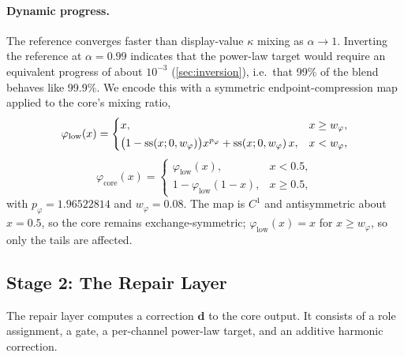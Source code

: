 \paragraph{Dynamic progress.}
The reference converges faster than display-value $\kappa$ mixing as $\alpha\to1$. Inverting the reference at $\alpha=0.99$ indicates that the power-law target would require an equivalent progress of about $10^{-3}$ (\cref{sec:inversion}), i.e.\ that 99\% of the blend behaves like 99.9\%. We encode this with a symmetric endpoint-compression map applied to the core's mixing ratio,
\begin{equation}
\varphi_{\mathrm{low}}(x)=
\begin{cases}
x, & x\ge w_{\varphi},\\[2pt]
\bigl(1-\operatorname{ss}(x;0,w_{\varphi})\bigr)x^{p_{\varphi}}+\operatorname{ss}(x;0,w_{\varphi})\,x, & x<w_{\varphi},
\end{cases}
\label{eq:philow}
\end{equation}
\begin{equation}
\varphi_{\mathrm{core}}(x)=
\begin{cases}
\varphi_{\mathrm{low}}(x), & x<0.5,\\
1-\varphi_{\mathrm{low}}(1-x), & x\ge0.5,
\end{cases}
\label{eq:phicore}
\end{equation}
with $p_{\varphi}=1.96522814$ and $w_{\varphi}=0.08$. The map is $C^{1}$ and antisymmetric about $x=0.5$, so the core remains exchange-symmetric; $\varphi_{\mathrm{low}}(x)=x$ for $x\ge w_{\varphi}$, so only the tails are affected.

\subsection{Stage 2: The Repair Layer}
\label{sec:repair}

The repair layer computes a correction $\mathbf{d}$ to the core output. It consists of a role assignment, a gate, a per-channel power-law target, and an additive harmonic correction.

